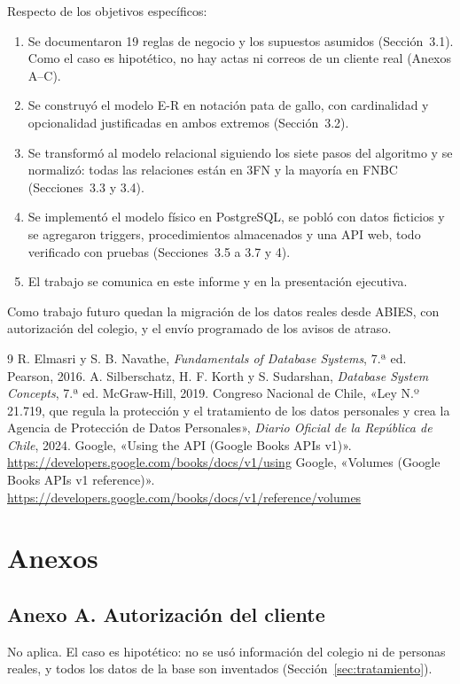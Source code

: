 \documentclass[11pt,a4paper]{article}
\begin{document}
Respecto de los objetivos específicos:
\begin{enumerate}[nosep]
\item Se documentaron 19 reglas de negocio y los supuestos asumidos (Sección~3.1). Como el caso es hipotético, no hay actas ni correos de un cliente real (Anexos A--C).
\item Se construyó el modelo E-R en notación pata de gallo, con cardinalidad y opcionalidad justificadas en ambos extremos (Sección~3.2).
\item Se transformó al modelo relacional siguiendo los siete pasos del algoritmo y se normalizó: todas las relaciones están en 3FN y la mayoría en FNBC (Secciones~3.3 y 3.4).
\item Se implementó el modelo físico en PostgreSQL, se pobló con datos ficticios y se agregaron triggers, procedimientos almacenados y una API web, todo verificado con pruebas (Secciones~3.5 a 3.7 y 4).
\item El trabajo se comunica en este informe y en la presentación ejecutiva.
\end{enumerate}
Como trabajo futuro quedan la migración de los datos reales desde ABIES, con autorización del colegio, y el envío programado de los avisos de atraso.

\begin{thebibliography}{9}
 R. Elmasri y S. B. Navathe, \textit{Fundamentals of Database Systems}, 7.ª ed. Pearson, 2016.
 A. Silberschatz, H. F. Korth y S. Sudarshan, \textit{Database System Concepts}, 7.ª ed. McGraw-Hill, 2019.
 Congreso Nacional de Chile, «Ley N.º 21.719, que regula la protección y el tratamiento de los datos personales y crea la Agencia de Protección de Datos Personales», \textit{Diario Oficial de la República de Chile}, 2024.
 Google, «Using the API (Google Books APIs v1)». \url{https://developers.google.com/books/docs/v1/using}
 Google, «Volumes (Google Books APIs v1 reference)». \url{https://developers.google.com/books/docs/v1/reference/volumes}
\end{thebibliography}

\appendix
\section*{Anexos}

\subsection*{Anexo A. Autorización del cliente}
No aplica. El caso es hipotético: no se usó información del colegio ni de personas reales, y todos los datos de la base son inventados (Sección~\ref{sec:tratamiento}).
\end{document}
